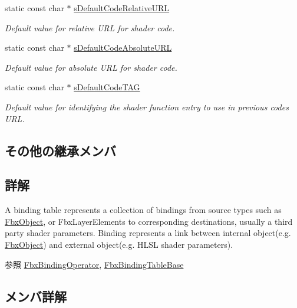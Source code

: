 \begin{DoxyCompactItemize}
static const char $\ast$ \hyperlink{class_fbx_binding_table_ac40c0a63d26e730175dfac64a58a8332}{s\+Default\+Code\+Relative\+U\+RL}
\begin{DoxyCompactList}\small\item\em Default value for relative U\+RL for shader code. \end{DoxyCompactList}\item 
static const char $\ast$ \hyperlink{class_fbx_binding_table_aa2ed12fb4230daa72892ec1ab6ee0c86}{s\+Default\+Code\+Absolute\+U\+RL}
\begin{DoxyCompactList}\small\item\em Default value for absolute U\+RL for shader code. \end{DoxyCompactList}\item 
static const char $\ast$ \hyperlink{class_fbx_binding_table_ac0dcff3f0d4d89f84814890e57e21452}{s\+Default\+Code\+T\+AG}
\begin{DoxyCompactList}\small\item\em Default value for identifying the shader function entry to use in previous code\textquotesingle{}s U\+RL. \end{DoxyCompactList}\end{DoxyCompactItemize}
\subsection*{その他の継承メンバ}


\subsection{詳解}
A binding table represents a collection of bindings from source types such as \hyperlink{class_fbx_object}{Fbx\+Object}, or Fbx\+Layer\+Elements to corresponding destinations, usually a third party shader parameters. Binding represents a link between internal object(e.\+g. \hyperlink{class_fbx_object}{Fbx\+Object}) and external object(e.\+g. H\+L\+SL shader parameters).

\begin{DoxySeeAlso}{参照}
\hyperlink{class_fbx_binding_operator}{Fbx\+Binding\+Operator}, \hyperlink{class_fbx_binding_table_base}{Fbx\+Binding\+Table\+Base} 
\end{DoxySeeAlso}


\subsection{メンバ詳解}
\mbox{\label{class_fbx_binding_table_a43a42110f701adae3164558d1b001275}} 
